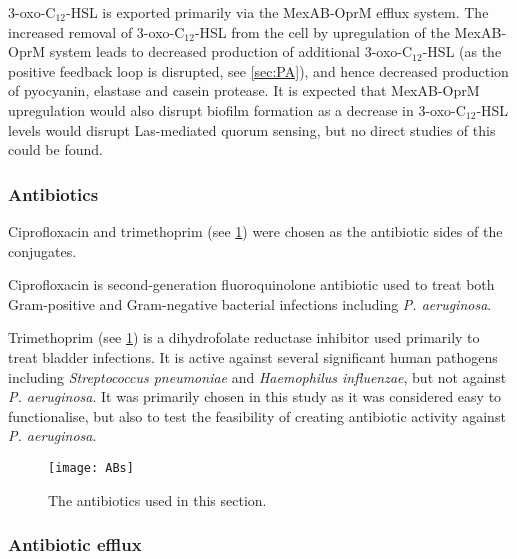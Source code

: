 3-oxo-C$_{12}$-HSL  is exported primarily via the MexAB-OprM efflux system\cite{Evans1998,Poole2004}.
The increased removal of 3-oxo-C$_{12}$-HSL  from the cell by upregulation of the MexAB-OprM system leads to decreased production of additional 3-oxo-C$_{12}$-HSL  (as the positive feedback loop is disrupted, see \ref{sec:PA}), and hence decreased production of pyocyanin, elastase and casein protease. 
It is expected that MexAB-OprM upregulation would also disrupt biofilm formation as a decrease in 3-oxo-C$_{12}$-HSL  levels would disrupt Las-mediated quorum sensing\cite{Davies1998}, but no direct studies of this could be found.

\subsubsection{Antibiotics}

Ciprofloxacin  and trimethoprim  (see \ref{fgr:ABs}) were chosen as the antibiotic sides of the conjugates.
 
Ciprofloxacin  is second-generation fluoroquinolone antibiotic used to treat both Gram-positive and Gram-negative bacterial infections including \textit{P. aeruginosa}\cite{Oliphant2002,Macgowan1999}.


Trimethoprim (see \ref{fgr:ABs}) is a dihydrofolate reductase inhibitor used primarily to treat bladder infections\cite{Brogden1982}. It is active against several significant human pathogens including \textit{Streptococcus pneumoniae} and \textit{Haemophilus influenzae}, but not against \textit{P. aeruginosa}. It was primarily chosen in this study as it was considered easy to functionalise, but also to test the feasibility of creating antibiotic activity against \textit{P. aeruginosa}.

\begin{figure}[H]
	\begin{center}
		\texttt{[image: ABs]}
		\caption{The antibiotics used in this section. \label{fgr:ABs}}
	\end{center}
\end{figure}



\subsubsection{Antibiotic efflux}

